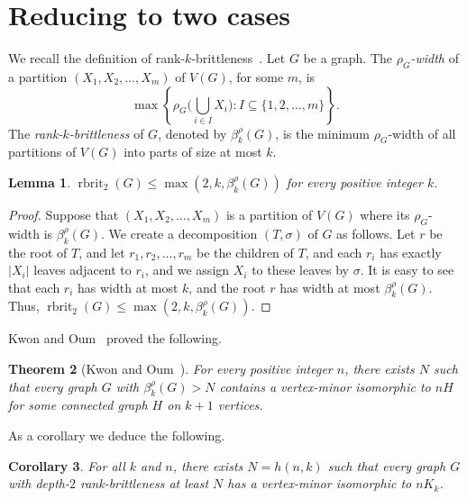 \documentclass[11pt]{article}
\newtheorem{theorem}{Theorem}[section]
\newtheorem{lemma}[theorem]{Lemma}
\newtheorem{corollary}[theorem]{Corollary}
\newcommand\abs[1]{\lvert #1\rvert}
\newcommand\rkbrit{\beta^\cutrk}
\newcommand\cutrk{\rho}
\newcommand\rbrit{\operatorname{rbrit}}
\begin{document}
	\section{Reducing to two cases}\label{sec:construction}
        We recall the definition of rank-$k$-brittleness~\cite{KO2018sca}.
	Let $G$ be a graph. 
	The \emph{$\rho_G$-width} of a partition $(X_1,X_2,\ldots,X_m)$ of $V(G)$, for some $m$,
        is \[
          \max\left\{ \rho_G\bigl(\bigcup_{i\in I} X_i\bigr): I\subseteq \{1,2,\ldots,m\}\right\}.
        \]
        The \emph{rank-$k$-brittleness} of $G$, denoted by $\rkbrit_k(G)$,
        is the minimum $\rho_G$-width of all partitions of $V(G)$ into 
        parts of size at most $k$.

	
	\begin{lemma}\label{lem:rkbrit}
		$\rbrit_2(G)\le \max (2, k, \rkbrit_k(G))$ for every positive integer $k$.
	\end{lemma}
	\begin{proof}
	Suppose that $(X_1,X_2,\ldots,X_m)$ is a partition of $V(G)$ where its $\rho_G$-width is $\rkbrit_k(G)$.
	We create a decomposition $(T, \sigma)$ of $G$ as follows.
	Let $r$ be the root of $T$, and let $r_1, r_2,\ldots, r_m$ be the children of $T$, 
	and each $r_i$ has exactly $\abs{X_i}$ leaves adjacent to $r_i$, and we assign $X_i$ to these leaves by $\sigma$.
	It is easy to see that each $r_i$ has width at most $k$, and 
	the root $r$ has width at most $\rkbrit_k(G)$.
	Thus, $\rbrit_2(G)\le \max (2, k, \rkbrit_k(G))$.
	\end{proof}
	Kwon and Oum~\cite{KO2018sca} proved the following.
        \begin{theorem}[Kwon and Oum~{\cite[Theorem 1.3]{KO2018sca}}]\label{thm:scattered}
          For every positive integer $n$,
          there exists $N$ such that
          every graph $G$ with $\beta^\rho_k(G)>N$
          contains a vertex-minor
          isomorphic to $nH$ for some connected graph $H$ on $k+1$ vertices.
        \end{theorem}
        As a corollary we deduce the following.
        \begin{corollary}\label{cor:scattered}
          For all $k$ and  $n$, there exists $N=h(n,k)$ such that 
          every graph $G$ with depth-$2$ rank-brittleness at least $N$
          has a vertex-minor isomorphic to $n K_k$.
        \end{corollary}
\end{document}
